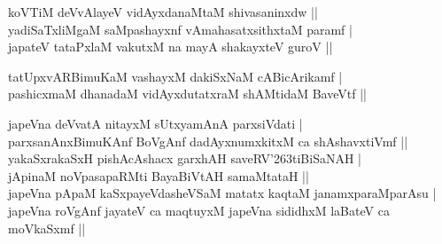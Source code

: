 \begin{entry}
\begin{shl}
koVTiM deVvAlayeV vidAyxdanaMtaM shivasaninxdw ||\\
yadiSaTxliMgaM saMpashayxnf vAmahasatxsithxtaM paramf |\\
japateV tataPxlaM vakutxM na mayA shakayxteV guroV ||
\end{shl}
\medskip
{}
\smallskip
\begin{shl}
tatUpxvARBimuKaM vashayxM dakiSxNaM cABicArikamf |\\
pashicxmaM dhanadaM vidAyxdutatxraM shAMtidaM BaveVtf ||
\end{shl}
\medskip
{}
\smallskip
\begin{shl}
japeVna deVvatA nitayxM sUtxyamAnA parxsiVdati |\\
parxsanAnxBimuKAnf BoVgAnf dadAyxnumxkitxM ca shAshavxtiVmf ||\\
yakaSxrakaSxH pishAcAshacx garxhAH saveRV{\char'263}tiBiSaNAH |\\
jApinaM noVpasapaRMti BayaBiVtAH samaMtataH ||\\
japeVna pApaM kaSxpayeVdasheVSaM matatx kaqtaM janamxparaMparAsu |\\
japeVna roVgAnf jayateV ca maqtuyxM japeVna sididhxM laBateV ca moVkaSxmf ||
\end{shl}
\medskip
{}
\end{entry}

